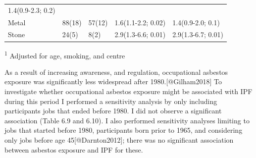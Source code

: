 \begin{longtable}[]{@{}lllll@{}}
\begin{minipage}[t]{0.24\columnwidth}
1.4(0.9-2.3; 0.2)\strut
\end{minipage}\tabularnewline
\begin{minipage}[t]{0.20\columnwidth}\raggedright
Metal\strut
\end{minipage} & \begin{minipage}[t]{0.08\columnwidth}\raggedright
88(18)\strut
\end{minipage} & \begin{minipage}[t]{0.10\columnwidth}\raggedright
57(12)\strut
\end{minipage} & \begin{minipage}[t]{0.24\columnwidth}\raggedright
1.6(1.1-2.2; 0.02)\strut
\end{minipage} & \begin{minipage}[t]{0.24\columnwidth}\raggedright
1.4(0.9-2.0; 0.1)\strut
\end{minipage}\tabularnewline
\begin{minipage}[t]{0.20\columnwidth}\raggedright
Stone\strut
\end{minipage} & \begin{minipage}[t]{0.08\columnwidth}\raggedright
24(5)\strut
\end{minipage} & \begin{minipage}[t]{0.10\columnwidth}\raggedright
8(2)\strut
\end{minipage} & \begin{minipage}[t]{0.24\columnwidth}\raggedright
2.9(1.3-6.6; 0.01)\strut
\end{minipage} & \begin{minipage}[t]{0.24\columnwidth}\raggedright
2.9(1.3-6.7; 0.01)\strut
\end{minipage}\tabularnewline
\bottomrule
\end{longtable}

\textsuperscript{1} Adjusted for age, smoking, and centre

As a result of increasing awareness, and regulation, occupational
asbestos exposure was significantly less widespread after
1980.{[}@Gilham2018{]} To investigate whether occupational asbestos
exposure might be associated with IPF during this period I performed a
sensitivity analysis by only including participants jobs that ended
before 1980. I did not observe a significant association (Table 6.9 and
6.10). I also performed sensitivity analyses limiting to jobs that
started before 1980, participants born prior to 1965, and considering
only jobs before age 45{[}@Darnton2012{]}; there was no significant
association between asbestos exposure and IPF for these.

